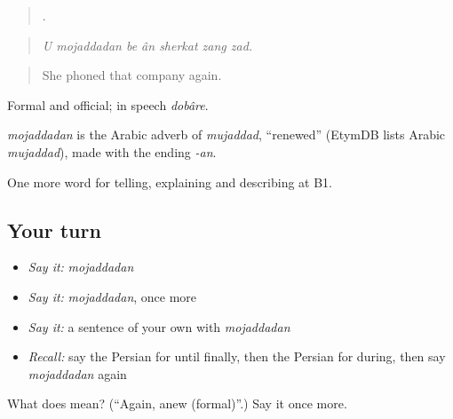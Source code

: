 \begin{quote}
      .
\end{quote}

\begin{quote}
\emph{U mojaddadan be ân sherkat zang zad.}
\end{quote}

\begin{quote}
She phoned that company again.
\end{quote}

Formal and official; in speech \emph{dobâre}.

\begin{cousinweb}
\emph{mojaddadan} is the Arabic adverb of \emph{mujaddad}, \textquotedblleft{}renewed\textquotedblright{} (EtymDB lists Arabic \emph{mujaddad}), made with the ending \emph{-an}.
\end{cousinweb}

\begin{grammarlens}[title={What you've built}]
One more word for telling, explaining and describing at B1.
\end{grammarlens}

\subsection*{Your turn}
\begin{itemize}
\raggedright
  \item \emph{Say it:} \emph{mojaddadan}
  \item \emph{Say it:} \emph{mojaddadan}, once more
  \item \emph{Say it:} a sentence of your own with \emph{mojaddadan}
  \item \emph{Recall:} say the Persian for until finally, then the Persian for during, then say \emph{mojaddadan} again
\end{itemize}

\begin{tcolorbox}[breakable,colback=teal!4,colframe=teal!35!black,title={Before you move on}]
What does  mean? (\textquotedblleft{}Again, anew (formal)\textquotedblright{}.) Say it once more.
\end{tcolorbox}
